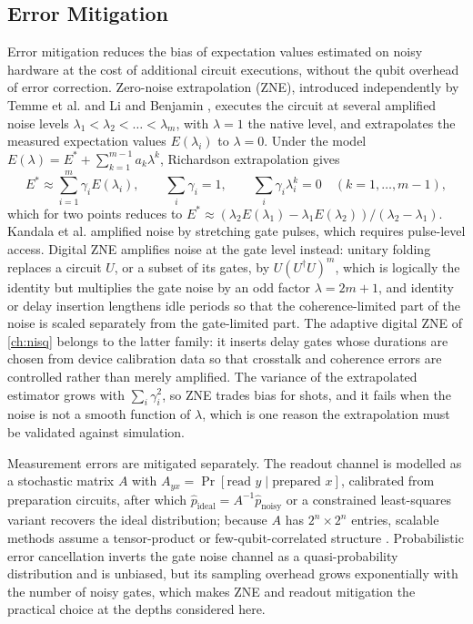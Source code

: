\subsection{Error Mitigation}

Error mitigation reduces the bias of expectation values estimated on noisy hardware at the cost of additional circuit executions, without the qubit overhead of error correction. Zero-noise extrapolation (ZNE), introduced independently by Temme et al. \cite{temme2017errormitigation} and Li and Benjamin \cite{li2017activeerror}, executes the circuit at several amplified noise levels $\lambda_1<\lambda_2<\dots<\lambda_m$, with $\lambda=1$ the native level, and extrapolates the measured expectation values $E(\lambda_i)$ to $\lambda=0$. Under the model $E(\lambda)=E^{\ast}+\sum_{k=1}^{m-1}a_k\lambda^k$, Richardson extrapolation gives
\begin{equation}\label{eq:bg:zne}
E^{\ast}\approx\sum_{i=1}^{m}\gamma_iE(\lambda_i),\qquad \sum_{i}\gamma_i=1,\qquad \sum_{i}\gamma_i\lambda_i^{k}=0\quad(k=1,\dots,m-1),
\end{equation}
which for two points reduces to $E^{\ast}\approx(\lambda_2E(\lambda_1)-\lambda_1E(\lambda_2))/(\lambda_2-\lambda_1)$. Kandala et al. \cite{kandala2019errormitigation} amplified noise by stretching gate pulses, which requires pulse-level access. Digital ZNE \cite{giurgicatiron2020digitalzne} amplifies noise at the gate level instead: unitary folding replaces a circuit $U$, or a subset of its gates, by $U(U^{\dagger}U)^{m}$, which is logically the identity but multiplies the gate noise by an odd factor $\lambda=2m+1$, and identity or delay insertion lengthens idle periods so that the coherence-limited part of the noise is scaled separately from the gate-limited part. The adaptive digital ZNE of \cref{ch:nisq} \cite{guo2025deal} belongs to the latter family: it inserts delay gates whose durations are chosen from device calibration data so that crosstalk and coherence errors are controlled rather than merely amplified. The variance of the extrapolated estimator grows with $\sum_i\gamma_i^2$, so ZNE trades bias for shots, and it fails when the noise is not a smooth function of $\lambda$, which is one reason the extrapolation must be validated against simulation.

Measurement errors are mitigated separately. The readout channel is modelled as a stochastic matrix $A$ with $A_{yx}=\Pr[\text{read }y\mid\text{prepared }x]$, calibrated from preparation circuits, after which $\hat{p}_{\mathrm{ideal}}=A^{-1}\hat{p}_{\mathrm{noisy}}$ or a constrained least-squares variant recovers the ideal distribution; because $A$ has $2^n\times2^n$ entries, scalable methods assume a tensor-product or few-qubit-correlated structure \cite{bravyi2021measurement}. Probabilistic error cancellation \cite{temme2017errormitigation} inverts the gate noise channel as a quasi-probability distribution and is unbiased, but its sampling overhead grows exponentially with the number of noisy gates, which makes ZNE and readout mitigation the practical choice at the depths considered here.

